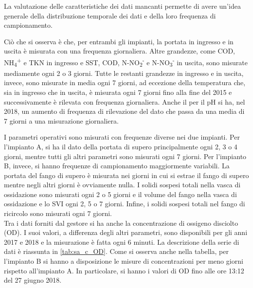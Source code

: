 La valutazione delle caratteristiche dei dati mancanti permette di avere un'idea generale della distribuzione temporale dei dati e della loro frequenza di campionamento. 

Ciò che si osserva è che, per entrambi gli impianti, la portata in ingresso e in uscita è misurata con una frequenza giornaliera. Altre grandezze, come COD, NH\textsubscript{4}\textsuperscript{+} e TKN in ingresso e SST, COD, N-NO\textsubscript{2}\textsuperscript{-} e N-NO\textsubscript{3}\textsuperscript{-} in uscita, sono misurate mediamente ogni 2 o 3 giorni. Tutte le restanti grandezze in ingresso e in uscita, invece, sono misurate in media ogni 7 giorni, ad eccezione della temperatura che, sia in ingresso che in uscita, è misurata ogni 7 giorni fino alla fine del 2015 e successivamente è rilevata con frequenza giornaliera. Anche il per il pH si ha, nel 2018, un aumento di frequenza di rilevazione del dato che passa da una media di 7 giorni a una misurazione giornaliera.

I parametri operativi sono misurati con frequenze diverse nei due impianti. Per l'impianto A, si ha il dato della portata di supero principalmente ogni 2, 3 o 4 giorni, mentre tutti gli altri parametri sono misurati ogni 7 giorni. Per l'impianto B, invece, si hanno frequenze di campionamento maggiormente variabili. La portata del fango di supero è misurata nei giorni in cui si estrae il fango di supero mentre negli altri giorni è ovviamente nulla. I solidi sospesi totali nella vasca di ossidazione sono misurati ogni 2 o 5 giorni e il volume del fango nella vasca di ossidazione e lo SVI ogni 2, 5 o 7 giorni. Infine, i solidi sospesi totali nel fango di ricircolo sono misurati ogni 7 giorni.\\

Tra i dati forniti dal gestore si ha anche la concentrazione di ossigeno disciolto (OD). I suoi valori, a differenza degli altri parametri, sono disponibili per gli anni 2017 e 2018 e la misurazione è fatta ogni 6 minuti. La descrizione della serie di dati è riassunta in \autoref{tab:sa_c_OD}. Come si osserva anche nella tabella, per l'impianto B si hanno a disposizione le misure di concentrazioni per meno giorni rispetto all'impianto A. In particolare, si hanno i valori di OD fino alle ore 13:12 del 27 giugno 2018.



